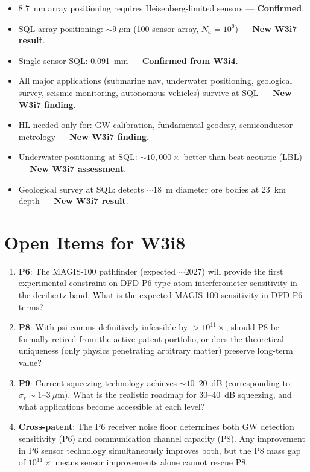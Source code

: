 \documentclass[11pt]{article}
\theoremstyle{definition}
\theoremstyle{remark}
\begin{document}
\begin{tcolorbox}[colback=green!5!white, colframe=green!40!black,
  title=\textbf{P9: Positioning --- SQL Sufficient for Major Applications}]
\begin{itemize}[nosep]
\item 8.7~nm array positioning requires Heisenberg-limited sensors ---
  \textbf{Confirmed}.
\item SQL array positioning: $\sim 9~\mu$m (100-sensor array,
  $N_a = 10^6$) --- \textbf{New W3i7 result}.
\item Single-sensor SQL: 0.091~mm --- \textbf{Confirmed from W3i4}.
\item All major applications (submarine nav, underwater positioning,
  geological survey, seismic monitoring, autonomous vehicles) survive
  at SQL --- \textbf{New W3i7 finding}.
\item HL needed only for: GW calibration, fundamental geodesy,
  semiconductor metrology --- \textbf{New W3i7 finding}.
\item Underwater positioning at SQL: $\sim 10{,}000\times$ better than
  best acoustic (LBL) --- \textbf{New W3i7 assessment}.
\item Geological survey at SQL: detects $\sim 18$~m diameter ore bodies
  at 23~km depth --- \textbf{New W3i7 result}.
\end{itemize}
\end{tcolorbox}

\section{Open Items for W3i8}
\label{sec:open}

\begin{enumerate}
\item \textbf{P6}: The MAGIS-100 pathfinder (expected $\sim$2027) will
  provide the first experimental constraint on DFD P6-type atom
  interferometer sensitivity in the decihertz band. What is the expected
  MAGIS-100 sensitivity in DFD P6 terms?

\item \textbf{P8}: With psi-comms definitively infeasible by
  $> 10^{11}\times$, should P8 be formally retired from the active patent
  portfolio, or does the theoretical uniqueness (only physics penetrating
  arbitrary matter) preserve long-term value?

\item \textbf{P9}: Current squeezing technology achieves $\sim 10$--$20$~dB
  (corresponding to $\sigma_r \sim 1$--$3~\mu$m). What is the realistic
  roadmap for 30--40~dB squeezing, and what applications become accessible
  at each level?

\item \textbf{Cross-patent}: The P6 receiver noise floor determines both
  GW detection sensitivity (P6) and communication channel capacity (P8).
  Any improvement in P6 sensor technology simultaneously improves both,
  but the P8 mass gap of $10^{11}\times$ means sensor improvements alone
  cannot rescue P8.
\end{enumerate}
\end{document}
